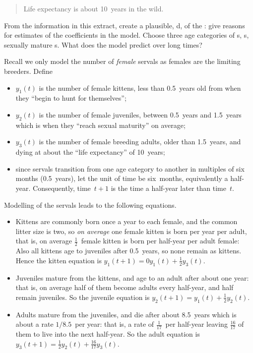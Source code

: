 \begin{example}
\begin{quote}
Life expectancy is about 10~years in the wild.
\end{quote}
From the information in this extract, create a plausible, d,   of the : give reasons for estimates of the coefficients in the model.
Choose three age categories of s, s, sexually mature s.
What does the model predict over long times?
\begin{solution} 
Recall we only model the number of \emph{female} servals as females are the limiting breeders.
Define 
\begin{itemize}
\item \(y_1(t)\) is the number of female kittens, less than 0.5~years old from when they ``begin to hunt for themselves'';
\item \(y_2(t)\) is the number of female juveniles, between 0.5~years and 1.5~years which is when they ``reach sexual maturity'' on average;
\item \(y_3(t)\) is the number of female breeding adults, older than 1.5~years, and dying at about the ``life expectancy'' of 10~years;
\item since servals transition from one age category to another in multiples of six months (0.5~years), let the unit of time be six~months, equivalently a half-year.  
Consequently, time~\(t+1\) is the time a half-year later than time~\(t\).
\end{itemize}
Modelling of the servals leads to the following equations.
\begin{itemize}
\item Kittens are commonly born once a year to each female, and the common litter size is two, so \emph{on average} one female kitten is born per year per adult, that is, on average \(\frac12\)~female kitten is born per half-year per adult female:
Also all kittens age to juveniles after 0.5~years, so none remain as kittens.  
Hence the kitten equation is \(y_1(t+1)=0y_1(t)+\tfrac12y_3(t)\).
\item Juveniles mature from the kittens, and age to an adult after about one year: that is, on average half of them become adults every half-year, and half remain juveniles.
So the juvenile equation is \(y_2(t+1)=y_1(t)+\tfrac12y_2(t)\).
\item Adults mature from the juveniles, and die after about 8.5~years which is about a rate \(1/8.5\)~per year: that is, a rate of \(\frac1{17}\)~per half-year leaving \(\tfrac{16}{17}\) of them to live into the next half-year.
So the adult equation is \( y_3(t+1)=\tfrac12y_2(t)+\tfrac{16}{17}y_3(t)\).
\end{itemize}


\end{solution}
\end{example}

